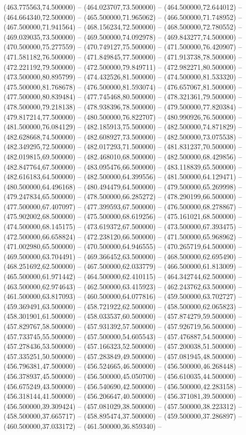 (463.775563,74.500000) -- (464.023707,73.500000) -- (464.500000,72.644012) -- (464.664340,72.500000) -- (465.500000,71.965062) -- (466.500000,71.748952) -- (467.500000,71.941564) -- (468.156234,72.500000) -- (468.500000,72.780552) -- (469.039035,73.500000) -- (469.500000,74.092978) -- (469.843277,74.500000) -- (470.500000,75.277559) -- (470.749127,75.500000) -- (471.500000,76.420907) -- (471.581182,76.500000) -- (471.849845,77.500000) -- (471.913738,78.500000) -- (472.221192,79.500000) -- (472.500000,79.849711) -- (472.982271,80.500000) -- (473.500000,80.895799) -- (474.432526,81.500000) -- (474.500000,81.533320) -- (475.500000,81.768678) -- (476.500000,81.593074) -- (476.657067,81.500000) -- (477.500000,80.839484) -- (477.745468,80.500000) -- (478.321361,79.500000) -- (478.500000,79.218138) -- (478.938396,78.500000) -- (479.500000,77.820384) -- (479.817214,77.500000) -- (480.500000,76.822707) -- (480.990926,76.500000) -- (481.500000,76.084129) -- (482.185913,75.500000) -- (482.500000,74.871829) -- (482.628668,74.500000) -- (482.608927,73.500000) -- (482.500000,73.075538) -- (482.349295,72.500000) -- (482.017293,71.500000) -- (481.831237,70.500000) -- (482.019815,69.500000) -- (482.468010,68.500000) -- (482.500000,68.429856) -- (482.847764,67.500000) -- (483.095476,66.500000) -- (483.118839,65.500000) -- (482.616183,64.500000) -- (482.500000,64.399556) -- (481.500000,64.129471) -- (480.500000,64.496168) -- (480.494479,64.500000) -- (479.500000,65.269998) -- (479.247834,65.500000) -- (478.500000,66.285272) -- (478.290199,66.500000) -- (477.500000,67.407097) -- (477.399593,67.500000) -- (476.500000,68.278867) -- (475.902002,68.500000) -- (475.500000,68.619256) -- (475.161021,68.500000) -- (474.500000,68.145175) -- (473.619372,67.500000) -- (473.500000,67.393475) -- (472.500000,66.658824) -- (472.238120,66.500000) -- (471.500000,65.968962) -- (471.002980,65.500000) -- (470.500000,64.946555) -- (470.265719,64.500000) -- (469.500000,63.704491) -- (469.366452,63.500000) -- (468.500000,62.695490) -- (468.251692,62.500000) -- (467.500000,62.033779) -- (466.500000,61.813009) -- (465.500000,61.971442) -- (464.500000,62.410115) -- (464.342744,62.500000) -- (463.500000,62.974643) -- (462.500000,63.415923) -- (462.243762,63.500000) -- (461.500000,63.817093) -- (460.500000,64.077816) -- (459.500000,63.702727) -- (459.369491,63.500000) -- (458.721922,62.500000) -- (458.500000,62.065823) -- (458.301901,61.500000) -- (458.033537,60.500000) -- (457.874279,59.500000) -- (457.829767,58.500000) -- (457.931392,57.500000) -- (457.926719,56.500000) -- (457.733745,55.500000) -- (457.500000,54.605543) -- (457.476887,54.500000) -- (457.278436,53.500000) -- (457.166323,52.500000) -- (457.200038,51.500000) -- (457.335251,50.500000) -- (457.283849,49.500000) -- (457.081945,48.500000) -- (456.796381,47.500000) -- (456.524665,46.500000) -- (456.500000,46.268448) -- (456.378937,45.500000) -- (456.500000,45.050700) -- (456.610035,44.500000) -- (456.675249,43.500000) -- (456.540690,42.500000) -- (456.500000,42.283158) -- (456.318144,41.500000) -- (456.206647,40.500000) -- (456.371081,39.500000) -- (456.500000,39.309424) -- (457.081029,38.500000) -- (457.500000,38.223312) -- (458.500000,37.665717) -- (458.895474,37.500000) -- (459.500000,37.286897) -- (460.500000,37.033172) -- (461.500000,36.859340) -- 